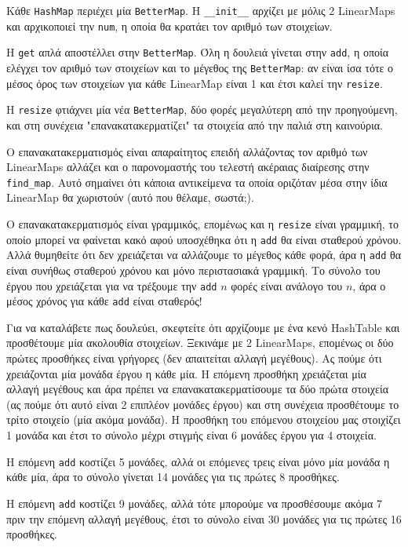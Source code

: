 \documentclass[10pt]{book}
\begin{document}
Κάθε {\tt HashMap} περιέχει μία {\tt BetterMap}.  Η \verb"__init__" αρχίζει με μόλις 2 LinearMaps και
αρχικοποιεί την {\tt num}, η οποία θα κρατάει τον αριθμό των στοιχείων.

Η {\tt get} απλά αποστέλλει στην {\tt BetterMap}.  Όλη η δουλειά γίνεται στην {\tt add}, η οποία ελέγχει
τον αριθμό των στοιχείων και το μέγεθος της {\tt BetterMap}: αν είναι ίσα τότε ο μέσος όρος των στοιχείων 
για κάθε LinearMap είναι 1 και έτσι καλεί την {\tt resize}.

Η {\tt resize} φτιάχνει μία νέα {\tt BetterMap}, δύο φορές μεγαλύτερη από την προηγούμενη, και στη συνέχεια
"επανακατακερματίζει" τα στοιχεία από την παλιά στη καινούρια.

Ο επανακατακερματισμός είναι απαραίτητος επειδή αλλάζοντας τον αριθμό των LinearMaps αλλάζει και ο παρονομαστής
του τελεστή ακέραιας διαίρεσης στην \verb"find_map".  Αυτό σημαίνει ότι κάποια αντικείμενα τα οποία οριζόταν
μέσα στην ίδια LinearMap θα χωριστούν (αυτό που θέλαμε, σωστά;).

Ο επανακατακερματισμός είναι γραμμικός, επομένως και η {\tt resize} είναι γραμμική, το οποίο μπορεί να
φαίνεται κακό αφού υποσχέθηκα ότι η {\tt add} θα είναι σταθερού χρόνου.  Αλλά θυμηθείτε ότι δεν χρειάζεται
να αλλάζουμε το μέγεθος κάθε φορά, άρα η {\tt add} θα είναι συνήθως σταθερού χρόνου και μόνο περιστασιακά
γραμμική.  Το σύνολο του έργου που χρειάζεται για να τρέξουμε την {\tt add} $n$ φορές είναι ανάλογο του $n$,
άρα ο μέσος χρόνος για κάθε {\tt add} είναι σταθερός!

Για να καταλάβετε πως δουλεύει, σκεφτείτε ότι αρχίζουμε με ένα κενό HashTable και προσθέτουμε μία ακολουθία
στοιχείων.  Ξεκινάμε με 2 LinearMaps, επομένως οι δύο πρώτες προσθήκες είναι γρήγορες (δεν απαιτείται αλλαγή
μεγέθους).  Ας πούμε ότι χρειάζονται μία μονάδα έργου η κάθε μία.  Η επόμενη προσθήκη χρειάζεται μία αλλαγή
μεγέθους και άρα πρέπει να επανακατακερματίσουμε τα δύο πρώτα στοιχεία (ας πούμε ότι αυτό είναι 2 επιπλέον
μονάδες έργου) και στη συνέχεια προσθέτουμε το τρίτο στοιχείο (μία ακόμα μονάδα).  Η προσθήκη του επόμενου
στοιχείου μας στοιχίζει 1 μονάδα και έτσι το σύνολο μέχρι στιγμής είναι 6 μονάδες έργου για 4 στοιχεία.

Η επόμενη {\tt add} κοστίζει 5 μονάδες, αλλά οι επόμενες τρεις είναι μόνο μία μονάδα η κάθε μία, άρα το σύνολο
γίνεται 14 μονάδες για τις πρώτες 8 προσθήκες.

Η επόμενη {\tt add} κοστίζει 9 μονάδες, αλλά τότε μπορούμε να προσθέσουμε ακόμα 7 πριν την επόμενη αλλαγή
μεγέθους, έτσι το σύνολο είναι 30 μονάδες για τις πρώτες 16 προσθήκες.
\end{document}
